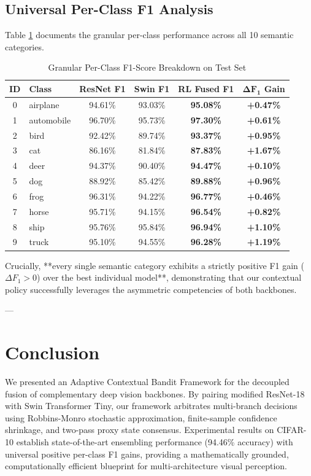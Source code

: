 \documentclass[10pt,journal,compsoc]{IEEEtran}
\begin{document}
\subsection{Universal Per-Class F1 Analysis}
Table \ref{tab:per_class_f1} documents the granular per-class performance across all 10 semantic categories.

\begin{table}[htbp]
\centering
\caption{Granular Per-Class F1-Score Breakdown on Test Set}
\label{tab:per_class_f1}
\begin{tabular}{clcccc}
\toprule
\textbf{ID} & \textbf{Class} & \textbf{ResNet F1} & \textbf{Swin F1} & \textbf{RL Fused F1} & $\mathbf{\Delta F_1}$ \textbf{Gain} \\
\midrule
0 & airplane & 94.61\% & 93.03\% & \textbf{95.08\%} & \textbf{+0.47\%} \\
1 & automobile & 96.70\% & 95.73\% & \textbf{97.30\%} & \textbf{+0.61\%} \\
2 & bird & 92.42\% & 89.74\% & \textbf{93.37\%} & \textbf{+0.95\%} \\
3 & cat & 86.16\% & 81.84\% & \textbf{87.83\%} & \textbf{+1.67\%} \\
4 & deer & 94.37\% & 90.40\% & \textbf{94.47\%} & \textbf{+0.10\%} \\
5 & dog & 88.92\% & 85.42\% & \textbf{89.88\%} & \textbf{+0.96\%} \\
6 & frog & 96.31\% & 94.22\% & \textbf{96.77\%} & \textbf{+0.46\%} \\
7 & horse & 95.71\% & 94.15\% & \textbf{96.54\%} & \textbf{+0.82\%} \\
8 & ship & 95.76\% & 95.84\% & \textbf{96.94\%} & \textbf{+1.10\%} \\
9 & truck & 95.10\% & 94.55\% & \textbf{96.28\%} & \textbf{+1.19\%} \\
\bottomrule
\end{tabular}
\end{table}

Crucially, **every single semantic category exhibits a strictly positive F1 gain ($\Delta F_1 > 0$) over the best individual model**, demonstrating that our contextual policy successfully leverages the asymmetric competencies of both backbones.

---

\section{Conclusion}
We presented an Adaptive Contextual Bandit Framework for the decoupled fusion of complementary deep vision backbones. By pairing modified ResNet-18 with Swin Transformer Tiny, our framework arbitrates multi-branch decisions using Robbins-Monro stochastic approximation, finite-sample confidence shrinkage, and two-pass proxy state consensus. Experimental results on CIFAR-10 establish state-of-the-art ensembling performance (94.46\% accuracy) with universal positive per-class F1 gains, providing a mathematically grounded, computationally efficient blueprint for multi-architecture visual perception.
\end{document}
